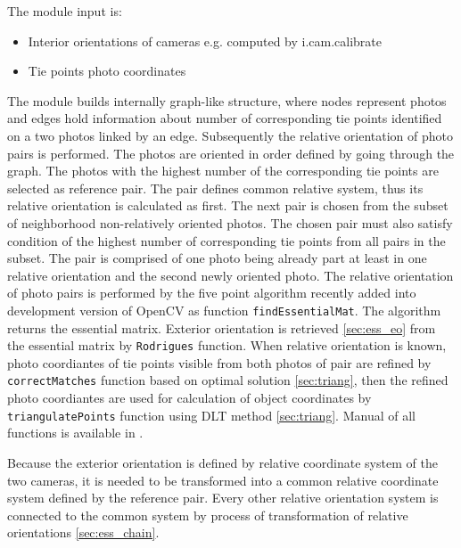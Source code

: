 \documentclass[a4paper,12pt]{article}
\begin{document}
The module input is: 
\begin{itemize}
\item Interior orientations of cameras e.g. computed by i.cam.calibrate
\item Tie points photo coordinates 
\end{itemize}




The module builds internally graph-like structure, where nodes represent photos and edges hold information 
about number of corresponding tie points identified on a two photos linked by an edge.
Subsequently the relative orientation of photo pairs is performed. The photos are oriented in order defined by going through the graph.
The photos with the highest number of the corresponding tie points are selected as reference pair. 
The pair defines common relative system, thus its relative orientation is calculated as first. 
The next pair is chosen from the subset of neighborhood non-relatively oriented photos. The chosen pair 
must also satisfy condition of the highest number of corresponding tie points from all pairs in the subset. The pair is comprised of one photo being already 
part at least in one relative orientation and the second newly oriented photo. The relative orientation of photo 
pairs is performed by  the five point algorithm recently added into development version of OpenCV as function {\tt findEssentialMat}.
The algorithm returns the essential matrix. Exterior orientation is retrieved \ref{sec:ess_eo} from the essential matrix by {\tt Rodrigues}  
function. When relative orientation is known, photo coordiantes of tie points visible from both photos of pair are refined by 
{\tt correctMatches} function based on optimal solution \ref{sec:triang},
then the refined photo coordiantes are used for calculation of object coordinates by {\tt triangulatePoints} function using DLT method \ref{sec:triang}. 
Manual of all functions is available in \cite{calib_manual2013opencv}.

Because the exterior orientation is defined by relative coordinate system of the two cameras, it is needed to be transformed into 
a common relative coordinate system defined by the reference pair.
Every other relative orientation system is connected to the common system 
by process of transformation of relative orientations \ref{sec:ess_chain}.
\end{document}
